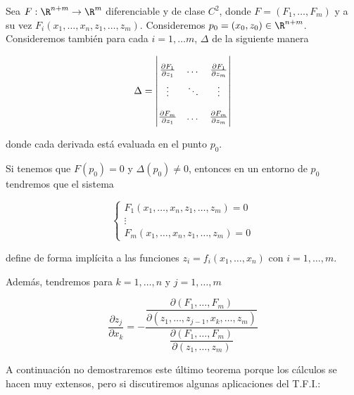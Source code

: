 \begin{teo}
    Sea $F: \R^{n+m} \rightarrow \R^m$ diferenciable y de clase $C^2$, donde $F = (F_1, \dots, F_m)$ y a su vez $F_i(x_1, \dots, x_n, z_1, \dots, z_m)$. Consideremos $p_0 = (x_0, z_0) \in \R^{n+m}$. Consideremos también para cada $i = 1, \dots m$, $\Delta$ de la siguiente manera
    
    \[
    \Delta =
    \renewcommand\arraystretch{2}
    \begin{vmatrix}
        \frac{\partial F_1}{\partial z_1} & \dots & \frac{\partial F_1}{\partial z_m} \\
        \vdots & \ddots & \vdots \\
        \frac{\partial F_m}{\partial z_1} & \dots & \frac{\partial F_m}{\partial z_m}
    \end{vmatrix}
    \]
    
    \noindent donde cada derivada está evaluada en el punto $p_0$.
    
    Si tenemos que $F(p_0) = 0$ y $\Delta(p_0) \neq 0$, entonces en un entorno de $p_0$ tendremos que el sistema
    
    \[
    \begin{cases}
        F_1(x_1, \dots, x_n, z_1, \dots, z_m) = 0 \\
        \vdots \\
        F_m(x_1, \dots, x_n, z_1, \dots, z_m) = 0
    \end{cases}
    \]
    
    \noindent define de forma implícita a las funciones $z_i = f_i(x_1, \dots, x_n)$ con $i = 1, \dots, m$.
    
    Además, tendremos para $k = 1, \dots, n$ y $j = 1, \dots, m$
    
    \[
    \dfrac{\partial z_j}{\partial x_k} = -\dfrac{\dfrac{\partial(F_1, \dots, F_m)}{\partial(z_1, \dots, z_{j-1}, x_k, \dots, z_m)}}{\dfrac{\partial(F_1, \dots, F_m)}{\partial(z_1, \dots, z_m)}}
    \]
\end{teo}

A continuación no demostraremos este último teorema porque los cálculos se hacen muy extensos, pero si discutiremos algunas aplicaciones del T.F.I.:

